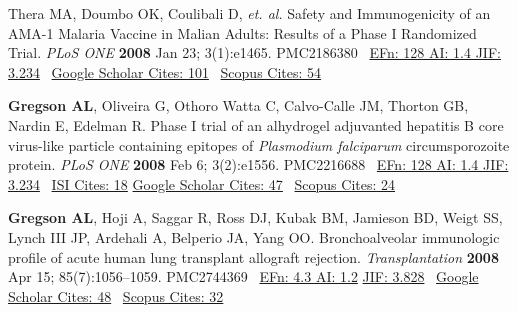 \documentclass[letterpaper,10pt,sans,dvipsnames,final]{moderncv}%
\begin{document}
\begin{thebibliography}{1}
 \bibitem[4]{} Thera MA, Doumbo OK, Coulibali D, \emph{et. al.} Safety and Immunogenicity of an AMA-1 Malaria Vaccine in Malian Adults: Results of a Phase I Randomized Trial. {\color{BrickRed}\textit{PLoS {\smaller ONE}}} \textbf{2008} Jan 23; 3(1):e1465. \href{http://dx.doi.org/10.1371/journal.pone.0001465}{\aiDoi} {\smaller PMC2186380}~
     {\color{NavyBlue} \href{http://admin-apps.isiknowledge.com/JCR/JCR?RQ=RECORD&rank=6&journal=PLOS+ONE}{{\smaller EFn: 128 AI: 1.4 JIF: 3.234}}~ 
     \href{http://scholar.google.com/scholar?cites=15540812245970669613&as_sdt=2005&sciodt=0,5&hl=en}{{\smaller Google Scholar Cites: 101}}~
     \href{http://www.scopus.com/record/display.url?eid=2-s2.0-44849126049&origin=inward&txGid=2728424DD3A06399B3857C04F09A7B4B.N5T5nM1aaTEF8rE6yKCR3A%3a31}{{\smaller Scopus Cites: 54}}
     }

 \bibitem[5]{} \textbf{Gregson AL}, Oliveira G, Othoro Watta C, Calvo-Calle JM, Thorton GB, Nardin E, Edelman R. Phase I trial of an alhydrogel adjuvanted hepatitis B core virus-like particle containing epitopes of \emph{Plasmodium falciparum} circumsporozoite protein. {\color{BrickRed}\textit{PLoS {\smaller ONE}}}  \textbf{2008} Feb 6; 3(2):e1556.  \href{http://www.plosone.org/doi/pone.0001556}{\aiDoi} {\smaller PMC2216688}~
     {\color{NavyBlue} \href{http://admin-apps.isiknowledge.com/JCR/JCR?RQ=RECORD&rank=6&journal=PLOS+ONE}{{\smaller EFn: 128 AI: 1.4 JIF: 3.234}}~ 
       \href{http://apps.webofknowledge.com/CitedFullRecord.do?product=WOS&colName=WOS&SID=3BKgP7NlJAN3im2FBbd&search_mode=CitedFullRecord&isickref=WOS:000260535700027&cacheurlFromRightClick=no}{{\smaller ISI Cites: 18}}
       \href{http://scholar.google.com/scholar?cites=3128529885204548330&as_sdt=2005&sciodt=0,5&hl=en}{{\smaller Google Scholar Cites: 47}}~
       \href{http://www.scopus.com/record/display.url?eid=2-s2.0-45249093689&origin=inward&txGid=2728424DD3A06399B3857C04F09A7B4B.N5T5nM1aaTEF8rE6yKCR3A%3a29}{{\smaller Scopus Cites: 24}}
     }

 \bibitem[6]{} \textbf{Gregson AL}, Hoji A, Saggar R, Ross DJ, Kubak BM, Jamieson BD, Weigt SS, Lynch III JP, Ardehali A, Belperio JA, Yang OO. Bronchoalveolar immunologic profile of acute human lung transplant allograft rejection. {\color{BrickRed}\textit{Transplantation}} \textbf{2008} Apr 15; 85(7):1056--1059. \href{http://dx.doi.org/10.1097/TP.0b013e318169bd85}{\aiDoi} {\smaller PMC2744369}~
   {\color{NavyBlue}\href{http://52.6.43.8/projects/journalRank/rankings.php?bsearch=transplantation&searchby=journal&orderby=eigenfactor}{{\smaller EFn: 4.3 AI: 1.2}}     \href{http://admin-apps.webofknowledge.com/JCR/JCR?RQ=RECORD&rank=1&journal=TRANSPLANTATION}{{\smaller JIF: 3.828}}~ 
     \href{http://scholar.google.com/scholar?cites=11900788784532627097&as_sdt=2005&sciodt=0,5&hl=en}{{\smaller Google Scholar Cites: 48}}~
     \href{http://www.scopus.com/record/display.url?eid=2-s2.0-42149110229&origin=inward&txGid=2728424DD3A06399B3857C04F09A7B4B.N5T5nM1aaTEF8rE6yKCR3A%3a27}{{\smaller Scopus Cites: 32}}
     }


\end{thebibliography}
\end{document}
